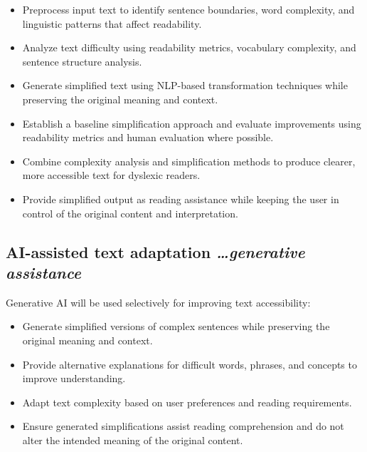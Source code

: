 \documentclass[11pt,a4paper]{article}
\newcommand{\BvrHint}[1]{%
  {\normalfont\normalsize\itshape\hfill #1}}
\begin{document}
\begin{itemize}[leftmargin=0.7cm]

    \item Preprocess input text to identify sentence boundaries, word complexity, and linguistic patterns that affect readability.

    \item Analyze text difficulty using readability metrics, vocabulary complexity, and sentence structure analysis.

    \item Generate simplified text using NLP-based transformation techniques while preserving the original meaning and context.

    \item Establish a baseline simplification approach and evaluate improvements using readability metrics and human evaluation where possible.

    \item Combine complexity analysis and simplification methods to produce clearer, more accessible text for dyslexic readers.

    \item Provide simplified output as reading assistance while keeping the user in control of the original content and interpretation.

\end{itemize}

\subsection{AI-assisted text adaptation %
\BvrHint{\ldots generative assistance}}

Generative AI will be used selectively for improving text accessibility:

\begin{itemize}[leftmargin=0.7cm]

    \item Generate simplified versions of complex sentences while preserving the original meaning and context.

    \item Provide alternative explanations for difficult words, phrases, and concepts to improve understanding.

    \item Adapt text complexity based on user preferences and reading requirements.

    \item Ensure generated simplifications assist reading comprehension and do not alter the intended meaning of the original content.

\end{itemize}
\end{document}
